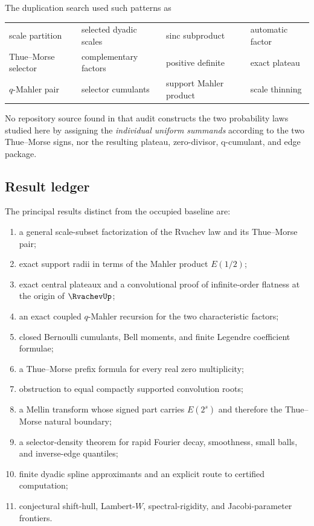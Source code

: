 \documentclass[11pt,oneside]{article}
\numberwithin{equation}{section}
\theoremstyle{definition}
\theoremstyle{remark}
\begin{document}
The duplication search used such patterns as
\begin{center}
\begin{tabular}{llll}
\toprule
scale partition & selected dyadic scales & sinc subproduct & automatic factor\\
Thue--Morse selector & complementary factors & positive definite & exact plateau\\
$q$-Mahler pair & selector cumulants & support Mahler product & scale thinning\\
\bottomrule
\end{tabular}
\end{center}
No repository source found in that audit constructs the two probability laws studied here
by assigning the \emph{individual uniform summands} according to the two Thue--Morse
signs, nor the resulting plateau, zero-divisor, q-cumulant, and edge package.

\subsection{Result ledger}

The principal results distinct from the occupied baseline are:
\begin{enumerate}[label=\textbf{R\arabic*.},leftmargin=3.5em]
\item a general scale-subset factorization of the Rvachev law and its Thue--Morse pair;
\item exact support radii in terms of the Mahler product $E(1/2)$;
\item exact central plateaux and a convolutional proof of infinite-order flatness at the
origin of $\RvachevUp$;
\item an exact coupled $q$-Mahler recursion for the two characteristic factors;
\item closed Bernoulli cumulants, Bell moments, and finite Legendre coefficient formulae;
\item a Thue--Morse prefix formula for every real zero multiplicity;
\item obstruction to equal compactly supported convolution roots;
\item a Mellin transform whose signed part carries $E(2^s)$ and therefore the Thue--Morse
natural boundary;
\item a selector-density theorem for rapid Fourier decay, smoothness, small balls, and
inverse-edge quantiles;
\item finite dyadic spline approximants and an explicit route to certified computation;
\item conjectural shift-hull, Lambert-$W$, spectral-rigidity, and Jacobi-parameter frontiers.
\end{enumerate}
\end{document}
